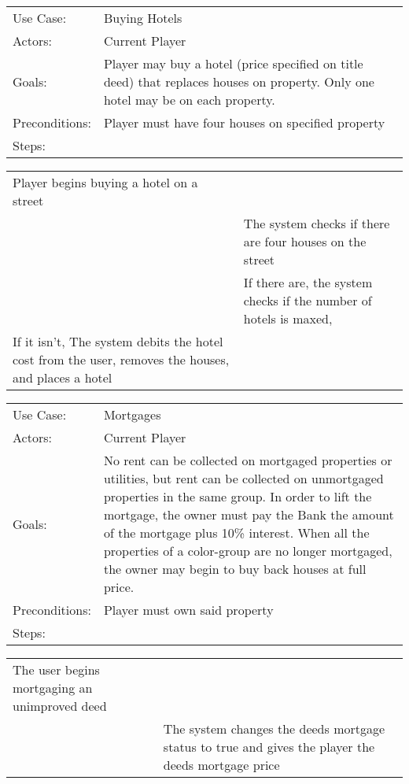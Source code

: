 \documentclass[10pt,letterpaper]{article}
\newcommand{\usecasetwocol}[1]{
\begin{center}
	\begin{tabularx}{0.8\textwidth}{| X X |}
		\hline
		#1 \\
		\hline
	\end{tabularx}
\end{center}
}
\newcommand{\usecasedescription}[1]{
\begin{center}
	\begin{tabularx}{0.8\textwidth}{X X}
		#1
	\end{tabularx}
\end{center}
}
\newcommand{\usecase}[2]{
\usecasedescription{#1}
\usecasetwocol{#2}
}
\begin{document}
\usecase{Use Case: & Buying Hotels \\
	Actors: & Current Player \\
	Goals: & Player may buy a hotel (price specified on title deed) that replaces houses on property. Only one hotel may be on each property. \\
	Preconditions: & Player must have four houses on specified property  \\
	Steps: &  }{Player begins buying a hotel on a street &\\
	&The system checks if there are four houses on the street \\
	&If there are, the system checks if the number of hotels is maxed,  \\
	If it isn’t, The system debits the hotel cost from the user, removes the houses, and places a hotel&}

\usecase{Use Case: & Mortgages \\
	Actors: & Current Player \\
	Goals: &  No rent can be collected on mortgaged properties or utilities, but rent can be collected on unmortgaged properties in the same group. In order to lift the mortgage, the owner must pay the Bank the amount of the mortgage plus 10\% interest. When all the properties of a color-group are no longer mortgaged, the owner may begin to buy back houses at full price.  \\
	Preconditions: & Player must own said property \\
	Steps: & }{The user begins mortgaging an unimproved deed &\\
	&The system changes the deeds mortgage status to true and gives the player the deeds mortgage price}
\end{document}
